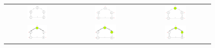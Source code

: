 \documentclass[12pt, a4paper]{article}
\begin{document}
\begin{figure}[h]
    \centering
    
    \begin{tabular}{ccc}
        \includegraphics[width=0.33\textwidth]{Images/1.png} & 
        \includegraphics[width=0.33\textwidth]{Images/2.png} &
        \includegraphics[width=0.33\textwidth]{Images/3.png} \\
    

        \includegraphics[width=0.33\textwidth]{Images/4.png} & 
        \includegraphics[width=0.33\textwidth]{Images/5.png} &
        \includegraphics[width=0.33\textwidth]{Images/6.png} \\


\end{tabular}
\end{figure}
\end{document}
